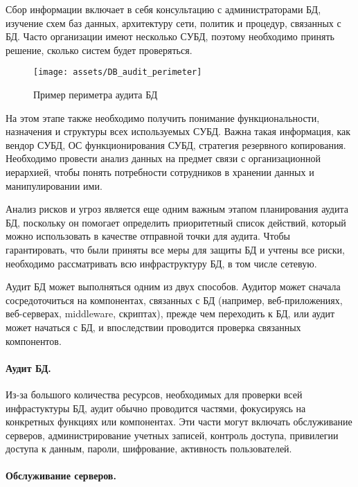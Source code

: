Сбор информации включает в себя консультацию с администраторами БД, изучение схем баз данных, архитектуру сети, политик и процедур, связанных с БД. Часто организации имеют несколько СУБД, поэтому необходимо принять решение, сколько систем будет проверяться.

\begin{figure}[h!]
    \centering
    \texttt{[image: assets/DB\_audit\_perimeter]}
    \caption{Пример периметра аудита БД}
	\label{fig:DB_audit_perimeter}
\end{figure}

На этом этапе также необходимо получить понимание функциональности, назначения и структуры всех используемых СУБД. Важна такая информация, как вендор СУБД, ОС функционирования СУБД, стратегия резервного копирования. Необходимо провести анализ данных на предмет связи с организационной иерархией, чтобы понять потребности сотрудников в хранении данных и манипулировании ими.

Анализ рисков и угроз является еще одним важным этапом планирования аудита БД, поскольку он помогает определить приоритетный список действий, который можно использовать в качестве отправной точки для аудита. Чтобы гарантировать, что были приняты все меры для защиты БД и учтены все риски, необходимо рассматривать всю инфраструктуру БД, в том числе сетевую.

Аудит БД может выполняться одним из двух способов. Аудитор может сначала сосредоточиться на компонентах, связанных с БД (например, веб-приложениях, веб-серверах, middleware, скриптах), прежде чем переходить к БД, или аудит может начаться с БД, и впоследствии проводится проверка связанных компонентов.

\paragraph{Аудит БД.}

Из-за большого количества ресурсов, необходимых для проверки всей инфрастуктуры БД, аудит обычно проводится частями, фокусируясь на конкретных функциях или компонентах. Эти части могут включать обслуживание серверов, администрирование учетных записей, контроль доступа, привилегии доступа к данным, пароли, шифрование, активность пользователей.

\paragraph{Обслуживание серверов.}

